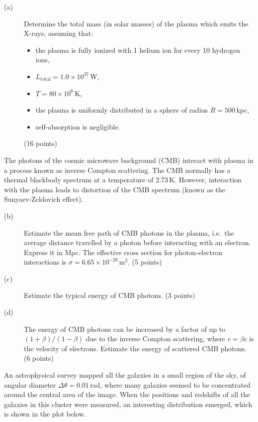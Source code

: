 \begin{description}
\item[(a)] Determine the total mass (in solar masses) of the plasma which
  emits the X-rays, assuming that:
  \begin{itemize}
  \item the plasma is fully ionized with 1 helium ion for every 10 hydrogen
    ions,
  \item $L_{\mathrm{total}} = 1.0 \times 10^{37}$\,W,
  \item $T = 80 \times 10^6$\,K,
  \item the plasma is uniformly distributed in a sphere of radius
    $R = 500$\,kpc,
  \item self-absorption is negligible.
  \end{itemize}
  \hfill(16 points)
\end{description}

The photons of the cosmic microwave background (CMB) interact with plasma in a
process known as inverse Compton scattering. The CMB normally has a thermal
blackbody spectrum at a temperature of 2.73\,K. However, interaction with the
plasma leads to distortion of the CMB spectrum (known as the
Sunyaev-Zeldovich effect).

\begin{description}
\item[(b)] Estimate the mean free path of CMB photons in the plasma, i.e.\ the
  average distance travelled by a photon before interacting with an electron.
  Express it in Mpc. The effective cross section for photon-electron
  interactions is $\sigma = 6.65 \times 10^{-29}$\,$\mathrm{m}^2$.
  \hfill(5 points)
\item[(c)] Estimate the typical energy of CMB photons. \hfill(3 points)
\item[(d)] The energy of CMB photons can be increased by a factor of up to
  $(1+\beta)/(1-\beta)$ due to the inverse Compton scattering, where
  $v = \beta c$ is the velocity of electrons. Estimate the energy of scattered
  CMB photons. \hfill(6 points)
\end{description}

An astrophysical survey mapped all the galaxies in a small region of the sky,
of angular diameter $\Delta\theta = 0.01$\,rad, where many galaxies seemed to
be concentrated around the central area of the image. When the positions and
redshifts of all the galaxies in this cluster were measured, an interesting
distribution emerged, which is shown in the plot below.


